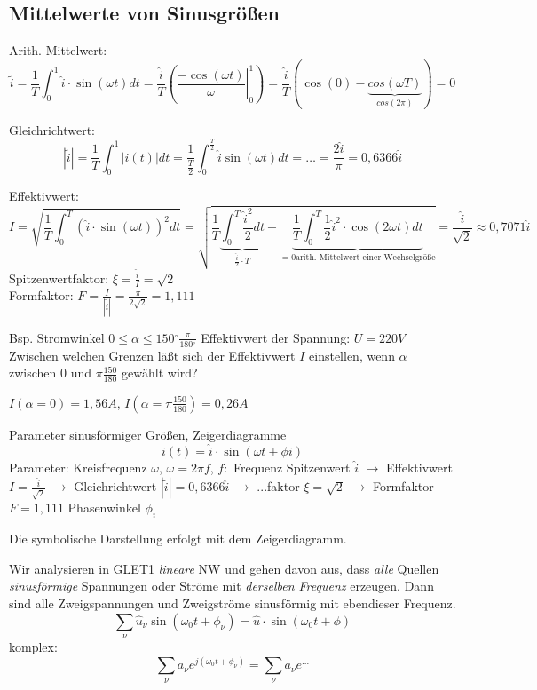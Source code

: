 \documentclass[german]{article}
\newcommand{\degree}{\ensuremath{^\circ}}
\begin{document}
\subsection{Mittelwerte von Sinusgrößen}
Arith. Mittelwert:
	\[ \tilde{i} = \frac1T \int_0^1 \hat{i} \cdot \sin(\omega t) dt = \frac{\hat{i}}T \left( \left. \frac{- \cos(\omega t)}\omega \right|_0^1 \right) = \frac{\hat{i}}T \left( \cos(0) - \underbrace{cos(\omega T)}_{cos(2\pi)}\right) = 0 \]

Gleichrichtwert:
	\[ | \tilde{i} | = \frac1T \int_0^1 |i(t)| dt = \frac1{\frac{T}2} \int_0^{\frac{T}2} \hat{i} \sin(\omega t) dt = \ldots = \frac{2\hat{i}}\pi = 0,6366 \hat{i} \]

Effektivwert:
	\[ I = \sqrt{ \frac1T \int_0^T \left( \hat{i} \cdot \sin(\omega t) \right)^2 dt } = \sqrt{ \frac1T \underbrace{\int_0^T \frac{{\hat{i}}^2}2 dt}_{\frac{\hat{i}}2 \cdot T} - \underbrace{\frac1T \int_0^T \frac12 {\hat{i}}^2 \cdot \cos(2\omega t) dt}_{=0 \text{arith. Mittelwert einer Wechselgröße}} } = \frac{\hat{i}}{\sqrt{2}} \approx 0,7071 \hat{i}\]
	Spitzenwertfaktor: $\xi = \frac{\hat{i}}I = \sqrt{2}$ \\
	Formfaktor: $F = \frac{I}{|\tilde{i}|} = \frac{\pi}{2 \sqrt{2}} = 1,111$

Bsp. %
Stromwinkel $0 \leq \alpha \leq 150\degree \frac{\pi}{180\degree}$
Effektivwert der Spannung: $U = 220V$
Zwischen welchen Grenzen läßt sich der Effektivwert $I$ einstellen, wenn $\alpha$ zwischen $0$ und $\pi \frac{150}{180}$ gewählt wird?


$I(\alpha = 0) = 1,56 A$, $I(\alpha = \pi \frac{150}{180}) = 0,26A$

Parameter sinusförmiger Größen, Zeigerdiagramme
\[ i(t) = \hat{i} \cdot \sin(\omega t + \phi i) \]
Parameter: Kreisfrequenz $\omega$, $\omega = 2 \pi f$, $f:$ Frequenz
Spitzenwert $\hat{i}$
	$\rightarrow$ Effektivwert $I = \frac{\hat{i}}{\sqrt{2}}$
	$\rightarrow$ Gleichrichtwert $|\tilde{i}| = 0,6366 \hat{i}$
	$\rightarrow$ ...faktor $\xi = \sqrt{2}$
	$\rightarrow$ Formfaktor $F = 1,111$
Phasenwinkel $\phi_i$

Die symbolische Darstellung erfolgt mit dem Zeigerdiagramm.

Wir analysieren in GLET1 {\it lineare} NW und gehen davon aus, dass {\it alle} Quellen {\it sinusförmige} Spannungen oder Ströme mit {\it derselben Frequenz} erzeugen. Dann sind alle Zweigspannungen und Zweigströme sinusförmig mit ebendieser Frequenz.
\[ \sum_{\nu} \hat{u}_{\nu} \sin( \omega_0 t + \phi_{\nu} ) = \hat{u} \cdot \sin( \omega_0 t + \phi ) \]
komplex:
\[ \sum_{\nu} a_{\nu} e^{j(\omega_0 t + \phi_{\nu})} = \sum_{\nu} a_{\nu} e^{...} \] %
\end{document}
